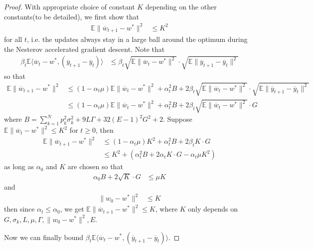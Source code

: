 \begin{proof}
With appropriate choice of constant $K$ depending on the other constants(to
be detailed), we first show that 
\begin{align*}
\mathbb{E}\|\overline{w}_{t+1}-w^{\ast}\|^{2} & \leq K^{2}
\end{align*}
 for all $t$, i.e. the updates always stay in a large ball around
the optimum during the Nesterov accelerated gradient descent. Note
that
\begin{align*}
\beta_{t}\mathbb{E}\langle\overline{w}_{t}-w^{\ast},(\overline{y}_{t+1}-\overline{y}_{t})\rangle & \leq\beta_{t}\sqrt{\mathbb{E}\|\overline{w}_{t}-w^{\ast}\|^{2}}\cdot\sqrt{\mathbb{E}\|\overline{y}_{t+1}-\overline{y}_{t}\|^{2}}
\end{align*}
 so that 
\begin{align*}
\mathbb{E}\|\overline{w}_{t+1}-w^{\ast}\|^{2} & \leq(1-\alpha_{t}\mu)\mathbb{E}\|\overline{w}_{t}-w^{\ast}\|^{2}+\alpha_{t}^{2}B+2\beta_{t}\sqrt{\mathbb{E}\|\overline{w}_{t}-w^{\ast}\|^{2}}\cdot\sqrt{\mathbb{E}\|\overline{y}_{t+1}-\overline{y}_{t}\|^{2}}\\
 & \leq(1-\alpha_{t}\mu)\mathbb{E}\|\overline{w}_{t}-w^{\ast}\|^{2}+\alpha_{t}^{2}B+2\beta_{t}\sqrt{\mathbb{E}\|\overline{w}_{t}-w^{\ast}\|^{2}}\cdot G
\end{align*}
 where $B=\sum_{k=1}^{N}p_{k}^{2}\sigma_{k}^{2}+9L\Gamma+32(E-1)^{2}G^{2}+2$.
Suppose $\mathbb{E}\|\overline{w}_{t}-w^{\ast}\|^{2}\leq K^{2}$ for
$t\geq0$, then 
\begin{align*}
\mathbb{E}\|\overline{w}_{t+1}-w^{\ast}\|^{2} & \leq(1-\alpha_{t}\mu)K^{2}+\alpha_{t}^{2}B+2\beta_{t}K\cdot G\\
 & \leq K^{2}+(\alpha_{t}^{2}B+2\alpha_{t}K\cdot G-\alpha_{t}\mu K^{2})
\end{align*}
 as long as $\alpha_{0}$ and $K$ are chosen so that 
\begin{align*}
\alpha_{0}B+2\sqrt{K}\cdot G & \leq\mu K
\end{align*}
 and
\begin{align*}
\|w_{0}-w^{\ast}\|^{2} & \leq K
\end{align*}
 then since $\alpha_{t}\leq\alpha_{0}$, we get $\mathbb{E}\|\overline{w}_{t+1}-w^{\ast}\|^{2}\leq K$,
where $K$ only depends on $G,\sigma_{k},L,\mu,\Gamma,\|w_{0}-w^{\ast}\|^{2},E$. 

Now we can finally bound $\beta_{t}\mathbb{E}\langle\overline{w}_{t}-w^{\ast},(\overline{y}_{t+1}-\overline{y}_{t})\rangle$.


\end{proof}

